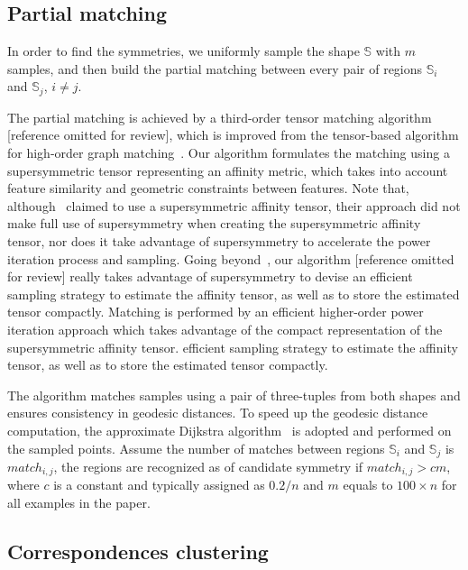 \subsection{Partial matching}
\label{subsec:matching}

In order to find the symmetries, we uniformly sample the shape $\mathbb{S}$ with $m$ samples,
and then build the partial matching between every pair of regions $\mathbb{S}_i$ and $\mathbb{S}_j$, $i \neq j$.

The partial matching is achieved by a third-order tensor matching algorithm [reference omitted for review],
which is improved from the tensor-based algorithm for high-order graph matching~\cite{Duchenne2011}.
Our algorithm formulates the matching using a supersymmetric tensor representing an affinity metric,
which takes into account feature similarity and geometric constraints between features.
Note that, although~\cite{Duchenne2011} claimed to use a supersymmetric affinity tensor,
their approach did not make full use of supersymmetry when creating the supersymmetric affinity tensor, nor does it take advantage of supersymmetry
to accelerate the power iteration process and sampling.
Going beyond~\cite{Duchenne2011}, our algorithm [reference omitted for review] really takes advantage of supersymmetry to devise an
efficient sampling strategy to estimate the affinity tensor, as well as to store the estimated tensor compactly.
Matching is performed by an efficient higher-order power iteration approach which takes advantage of the compact representation of the supersymmetric affinity tensor.
efficient sampling strategy to estimate the affinity tensor, as well as to store the estimated tensor compactly.

The algorithm matches samples using a pair of three-tuples from both shapes and ensures consistency in geodesic distances.
To speed up the geodesic distance computation, the approximate Dijkstra algorithm~\cite{Dijkstra1959} is adopted and performed on the sampled points.
Assume the number of matches between regions $\mathbb{S}_i$ and $\mathbb{S}_j$ is $match_{i,j}$,
the regions are recognized as of candidate symmetry if $match_{i,j} > cm$, where $c$ is a constant and typically assigned as $0.2/n$ and $m$ equals to $100 \times n$ 
for all examples in the paper.


\subsection{Correspondences clustering}

